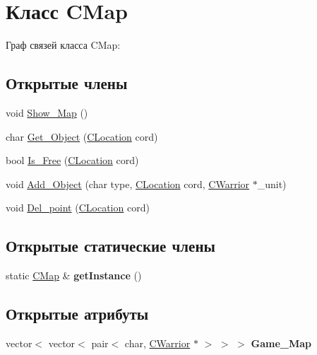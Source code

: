 \hypertarget{classCMap}{}\section{Класс C\+Map}
\label{classCMap}


Граф связей класса C\+Map\+:
\subsection*{Открытые члены}
\begin{DoxyCompactItemize}
\item 
void \hyperlink{classCMap_a5a770d632870a1f1a975de0eb64c42a6}{Show\+\_\+\+Map} ()
\item 
char \hyperlink{classCMap_a829f047001ddf0585b8926f6a3236a73}{Get\+\_\+\+Object} (\hyperlink{classCLocation}{C\+Location} cord)
\item 
bool \hyperlink{classCMap_a4f35269a043d55836c29108544e0f475}{Is\+\_\+\+Free} (\hyperlink{classCLocation}{C\+Location} cord)
\item 
void \hyperlink{classCMap_a6cd9b518727a73a222bab3e1d1485b98}{Add\+\_\+\+Object} (char type, \hyperlink{classCLocation}{C\+Location} cord, \hyperlink{classCWarrior}{C\+Warrior} $\ast$\+\_\+unit)
\item 
void \hyperlink{classCMap_a9053e68dafea3a0960d3c36686f2e2da}{Del\+\_\+point} (\hyperlink{classCLocation}{C\+Location} cord)
\end{DoxyCompactItemize}
\subsection*{Открытые статические члены}
\begin{DoxyCompactItemize}
\item 
static \hyperlink{classCMap}{C\+Map} \& {\bfseries get\+Instance} ()\hypertarget{classCMap_a8472a57ff745f4b1290b5cc70dc728c2}{}\label{classCMap_a8472a57ff745f4b1290b5cc70dc728c2}

\end{DoxyCompactItemize}
\subsection*{Открытые атрибуты}
\begin{DoxyCompactItemize}
\item 
vector$<$ vector$<$ pair$<$ char, \hyperlink{classCWarrior}{C\+Warrior} $\ast$ $>$ $>$ $>$ {\bfseries Game\+\_\+\+Map}\hypertarget{classCMap_af478ec9b317296ac6775d55ae29cc4d8}{}\label{classCMap_af478ec9b317296ac6775d55ae29cc4d8}

\end{DoxyCompactItemize}


